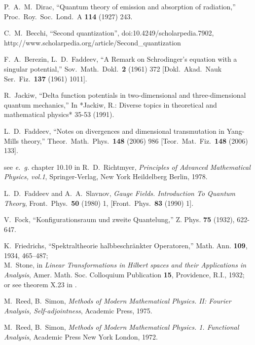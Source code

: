 \documentclass[12pt]{article}
\begin{document}
\begin{thebibliography}{0}

P.~A.~M.~Dirac,
``Quantum theory of emission and absorption of radiation,''
Proc.\ Roy.\ Soc.\ Lond.\ A {\bf 114} (1927) 243.

C.~M.~Becchi,
``Second quantization'', doi:10.4249/scholarpedia.7902,
http://www.scholarpedia.org/article/Second\_quantization

    F.~A.~Berezin, L.~D.~Faddeev,
  ``A Remark on Schrodinger's equation with a singular potential,''
  Sov.\ Math.\ Dokl.\  {\bf 2} (1961) 372
  [Dokl.\ Akad.\ Nauk Ser.\ Fiz.\  {\bf 137} (1961) 1011].

  R.~Jackiw,
  ``Delta function potentials in two-dimensional and three-dimensional
  quantum mechanics,''
  In *Jackiw, R.: Diverse topics in theoretical and mathematical physics*
  35-53 (1991).

L.~D.~Faddeev,
``Notes on divergences and dimensional transmutation in Yang-Mills theory,''
Theor.\ Math.\ Phys.\  {\bf 148} (2006) 986
[Teor.\ Mat.\ Fiz.\  {\bf 148} (2006) 133].

    see {\it e.~g.} chapter 10.10 in
    R.~D.~Richtmyer, \emph{Principles of Advanced Mathematical Physics, vol.1},
    Springer-Verlag, New York Heildelberg Berlin, 1978.

  L.~D.~Faddeev and A.~A.~Slavnov,
\emph{Gauge Fields. Introduction To Quantum Theory},
Front.\ Phys.\  {\bf 50} (1980) 1, [Front.\ Phys.\  {\bf 83} (1990) 1].

V.~Fock, ``Konfigurationsraum und zweite Quantelung,''
Z. Phys. {\bf 75} (1932), 622-647.

    K.~Friedrichs, ``Spektraltheorie halbbeschr\"ankter Operatoren,''
    Math. Ann. {\bf 109}, 1934, 465--487;\\
    M.~Stone, in \emph{Linear Transformations in Hilbert spaces and their
    Applications in Analysis}, Amer. Math. Soc. Colloquium Publication {\bf 15},
    Providence, R.I., 1932;\\
    or see theorem X.23 in \cite{RS2}.

 M.~Reed, B.~Simon, \emph{Methods of Modern Mathematical Physics.
II: Fourier Analysis, Self-adjointness}, Academic Press, 1975.

  M.~Reed, B.~Simon, \emph{Methods of Modern Mathematical
Physics. 1. Functional Analysis}, Academic Press New York London, 1972.


\end{thebibliography}
\end{document}
